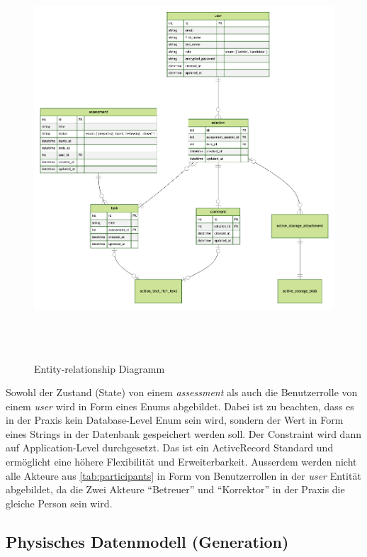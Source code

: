 \begin{figure}[H]
    \centering
    \includegraphics[height=15cm]{images/diagrams/entity-relation.png}
    \caption{\label{fig:erd} Entity-relationship Diagramm}
\end{figure}

\newpage

Sowohl der Zustand (State) von einem \emph{assessment} als auch die Benutzerrolle von einem \emph{user} wird in Form eines Enums abgebildet. Dabei ist zu beachten, dass es in der Praxis kein Database-Level Enum sein wird,
sondern der Wert in Form eines Strings in der Datenbank gespeichert werden soll. Der Constraint wird dann auf Application-Level durchgesetzt. Das ist ein ActiveRecord Standard und ermöglicht eine höhere Flexibilität und Erweiterbarkeit.
Ausserdem werden nicht alle Akteure aus \ref{tab:participants} in Form von Benutzerrollen in der \emph{user} Entität abgebildet, da die Zwei Akteure \enquote{Betreuer} und \enquote{Korrektor} in der Praxis die gleiche Person sein wird.

\subsection{Physisches Datenmodell (Generation)}

